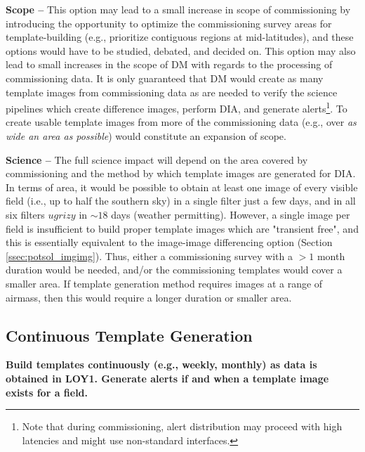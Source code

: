 \documentclass[DM,lsstdraft,toc]{lsstdoc}
\begin{document}
{\bf Scope --} This option may lead to a small increase in scope of commissioning by introducing the opportunity to optimize the commissioning survey areas for template-building (e.g., prioritize contiguous regions at mid-latitudes), and these options would have to be studied, debated, and decided on. This option may also lead to small increases in the scope of DM with regards to the processing of commissioning data. It is only guaranteed that DM would create as many template images from commissioning data as are needed to verify the science pipelines which create difference images, perform DIA, and generate alerts\footnote{Note that during commissioning, alert distribution may proceed with high latencies and might use non-standard interfaces.}. To create usable template images from more of the commissioning data (e.g., over {\em as wide an area as possible}) would constitute an expansion of scope.

{\bf Science --} The full science impact will depend on the area covered by commissioning and the method by which template images are generated for DIA. In terms of area, it would be possible to obtain at least one image of every visible field (i.e., up to half the southern sky) in a single filter just a few days, and in all six filters $ugrizy$ in $\sim18$ days (weather permitting). However, a single image per field is insufficient to build proper template images which are "transient free", and this is essentially equivalent to the image-image differencing option (Section \ref{ssec:potsol_imgimg}). Thus, either a commissioning survey with a $>1$ month duration would be needed, and/or the commissioning templates would cover a smaller area. If template generation method requires images at a range of airmass, then this would require a longer duration or smaller area.


\subsection{Continuous Template Generation}\label{ssec:potsol_cont}

{\bf Build templates continuously (e.g., weekly, monthly) as data is obtained in LOY1. Generate alerts if and when a template image exists for a field.}
\end{document}
